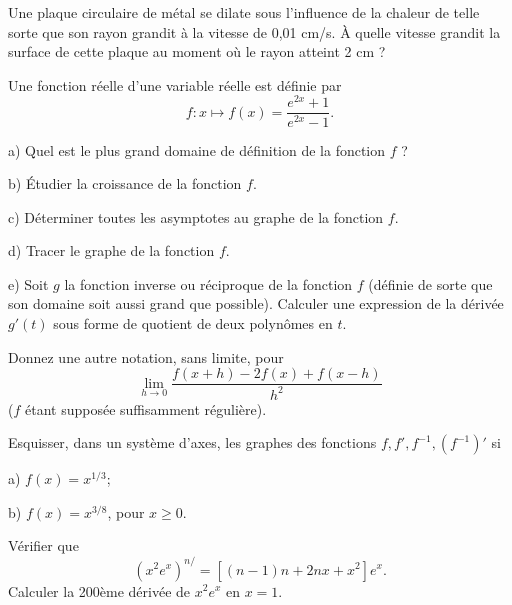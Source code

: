\documentclass[12pt,french,oneside,a4paper]{memoir} %
\begin{document}
\begin{exo}
Une plaque circulaire de métal se dilate sous l'influence de
 la chaleur de telle sorte que son rayon grandit à la vitesse de
 0,01 cm/s. À quelle vitesse grandit la surface de cette plaque au
 moment où le rayon atteint 2 cm ?
\end{exo}
\begin{exo}
Une fonction réelle d'une variable réelle est définie par
 \begin{equation*}
 f : x\mapsto f(x)=\displaystyle{\frac{e^{2x}+1}{e^{2x}-1}}.
\end{equation*}
 
 a) Quel est le plus grand domaine de définition de la fonction
 $f$ ?
 
 b) Étudier la croissance de la fonction $f$.
 
 c) Déterminer toutes les asymptotes au graphe de la fonction $f$.
 
 d) Tracer le graphe de la fonction $f$.
 
 e) Soit $g$ la fonction inverse ou réciproque de la fonction $f$
 (définie de sorte que son domaine soit aussi grand que possible).
 Calculer une expression de la dérivée $g'(t)$ sous forme de
 quotient de deux polynômes en $t$.
\end{exo}
\begin{exo}
Donnez une autre notation, sans limite, pour
 \begin{equation*}
 \lim_{h\rightarrow 0}\displaystyle{\frac{f(x+h)-2f(x)+f(x-h)}{h^2}}
\end{equation*}
 ($f$ étant supposée suffisamment régulière).
\end{exo}

\begin{exo}
Esquisser, dans un système d'axes, les graphes des fonctions
 $f, f', f^{-1}, (f^{-1})'$ si
 
 a) $f(x)=x^{1/3}$;
 
 b) $f(x) = x^{3/8}$, \quad pour $x\geq 0$.
\end{exo}
\begin{exo}
Vérifier que
 $$
 \displaystyle(x^2e^x)^{n/}=[(n-1)n+2nx+x^2]e^x.
 $$
 Calculer la 200ème dérivée de $x^2e^x$ en $x=1$.
\end{exo}
\end{document}
